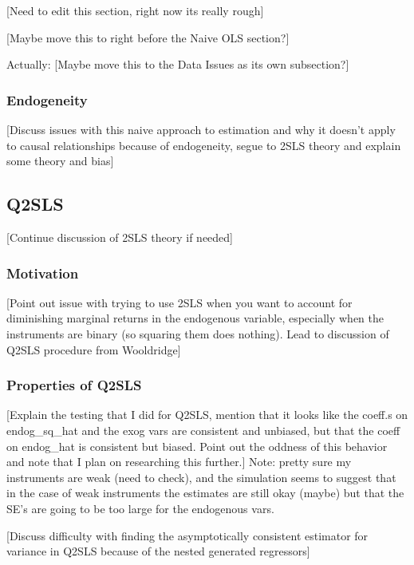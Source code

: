 \documentclass[12pt]{article}
\begin{document}
\textcolor{BrickRed}{[Need to edit this section, right now its really rough]}

\textcolor{BrickRed}{[Maybe move this to right before the Naive OLS section?]}

Actually: \textcolor{BrickRed}{[Maybe move this to the Data Issues as its own subsection?]}

\subsubsection{Endogeneity}
\textcolor{BrickRed}{[Discuss issues with this naive approach to estimation and why it doesn't apply to causal relationships because of endogeneity, segue to 2SLS theory and explain some theory and bias]}

\subsection{Q2SLS}
\textcolor{BrickRed}{[Continue discussion of 2SLS theory if needed]}

\subsubsection{Motivation}
\textcolor{BrickRed}{[Point out issue with trying to use 2SLS when you want to account for diminishing marginal returns in the endogenous variable, especially when the instruments are binary (so squaring them does nothing). Lead to discussion of Q2SLS procedure from Wooldridge]}

\subsubsection{Properties of Q2SLS}
\textcolor{BrickRed}{[Explain the testing that I did for Q2SLS, mention that it looks like the coeff.s on endog\_sq\_hat and the exog vars are consistent and unbiased, but that the coeff on endog\_hat is consistent but biased. Point out the oddness of this behavior and note that I plan on researching this further.]} Note: pretty sure my instruments are weak (need to check), and the simulation seems to suggest that in the case of weak instruments the estimates are still okay (maybe) but that the SE's are going to be too large for the endogenous vars.

\textcolor{BrickRed}{[Discuss difficulty with finding the asymptotically consistent estimator for variance in Q2SLS because of the nested generated regressors]}
\end{document}
